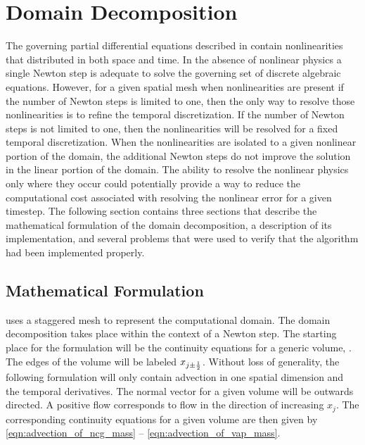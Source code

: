 \chapter{Domain Decomposition}
\label{chap:domain_decomposition}
The governing partial differential equations described in  contain nonlinearities that distributed in both space and time.
In the absence of nonlinear physics a single Newton step is adequate to solve the governing set of discrete algebraic equations.
However, for a given spatial mesh when nonlinearities are present if the number of Newton steps is limited to one, then the only way to resolve those nonlinearities is to refine the temporal discretization.
If the number of Newton steps is not limited to one, then the nonlinearities will be resolved for a fixed temporal discretization.
When the nonlinearities are isolated to a given nonlinear portion of the domain, the additional Newton steps do not improve the solution in the linear portion of the domain.
The ability to resolve the nonlinear physics only where they occur could potentially provide a way to reduce the computational cost associated with resolving the nonlinear error for a given timestep.
The following section contains three sections that describe the mathematical formulation of the domain decomposition, a description of its implementation, and several problems that were used to verify that the algorithm had been implemented properly.

\section{Mathematical Formulation}
\label{sec:dd_math}

\cobra{} uses a staggered mesh to represent the computational domain.
The domain decomposition takes place within the context of a Newton step.
The starting place for the formulation will be the continuity equations for a generic volume,  .
The edges of the volume will be labeled $x_{j \pm \onehalf}$.
Without loss of generality, the following formulation will only contain advection in one spatial dimension and the temporal derivatives.
The normal vector for a given volume will be outwards directed.
A positive flow corresponds to flow in the direction of increasing $x_{j}$.  
The corresponding continuity equations for a given volume are then given by \eqref{eqn:advection_of_ncg_mass} -- \eqref{eqn:advection_of_vap_mass}.

